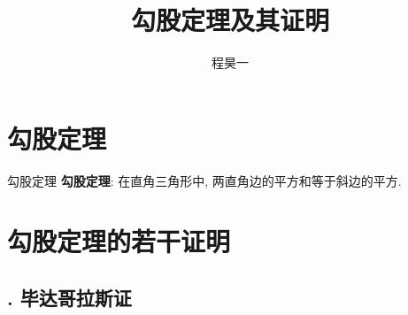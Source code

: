 \documentclass[serif]{beamer}
\title{\textbf{\heiti 勾股定理及其证明}}
\author{\kaishu 程昊一}
\date{}
\begin{document}
\setlength\abovedisplayskip{0.2cm}
\setlength\belowdisplayskip{0.2cm}

\begin{frame}
	\maketitle
\end{frame}

\section{\heiti 勾股定理}

\begin{frame}{\heiti 勾股定理}
	\textbf{勾股定理}: 在直角三角形中, 两直角边的平方和等于斜边的平方.
	
\end{frame}

\section{\heiti 勾股定理的若干证明}
\subsection{. 毕达哥拉斯证}
\end{document}

